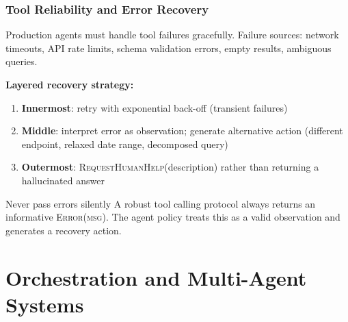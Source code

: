 \documentclass[9pt,t]{beamer}
\begin{document}
\begin{frame}
\frametitle{Tool Reliability and Error Recovery}

Production agents must handle tool failures gracefully. Failure sources:
network timeouts, API rate limits, schema validation errors, empty results, ambiguous queries.

\medskip
\textbf{Layered recovery strategy:}
\begin{enumerate}
  \item \textbf{Innermost}: retry with exponential back-off (transient failures)
  \item \textbf{Middle}: interpret error as observation; generate alternative action
        (different endpoint, relaxed date range, decomposed query)
  \item \textbf{Outermost}: \textsc{RequestHumanHelp}(description) rather than
        returning a hallucinated answer
\end{enumerate}

\medskip
\begin{alertblock}{Never pass errors silently}
A robust tool calling protocol always returns an informative \textsc{Error(msg)}.
The agent policy treats this as a valid observation and generates a recovery action.
\end{alertblock}
\end{frame}

\section{Orchestration and Multi-Agent Systems}
\end{document}
